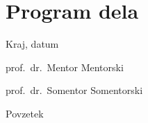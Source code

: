\documentclass[11pt,a4paper,twoside,slovene]{book}
\begin{document}

\cleardoublepage

\pagestyle{fancyplain}

{
\renewcommand{\markboth}[2]{}
\tableofcontents
}

\cleardoublepage


{
\renewcommand{\markboth}[2]{}
\listoffigures
}
%
\cleardoublepage


\chapter*{Program dela}


\bigskip

\begin{flushleft}
  Kraj, datum %
\end{flushleft}

\bigskip

\begin{flushright}
  prof.\ dr.\ Mentor Mentorski %
  \quad 
\end{flushright}

\vspace{1cm}
\begin{flushright}
  prof.\ dr.\ Somentor Somentorski %
  \quad
\end{flushright}

\cleardoublepage
{}
{}

\thispagestyle{empty}
\begin{center}
{\Large \sc Povzetek}
\end{center}
\end{document}
